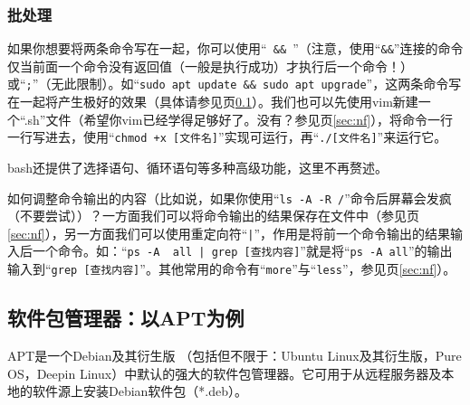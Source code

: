 \subsubsection{批处理}
\label{sec:bat}如果你想要将两条命令写在一起，你可以使用“\verb| && |”（注意，使用“\verb|&&|”连接的命令仅当前面一个命令没有返回值（一般是执行成功）才执行后一个命令！）或“\verb|;|”（无此限制）。如“\verb|sudo apt update && sudo apt upgrade|”，这两条命令写在一起将产生极好的效果（具体请参见\pageref{sec:apt}页\ref{sec:apt}）。我们也可以先使用vim新建一个“.sh”文件（希望你vim已经学得足够好了。没有？参见\pageref{sec:nf}页\ref{sec:nf}），将命令一行一行写进去，使用“\verb|chmod +x [文件名]|”实现可运行，再“\verb|./[文件名]|”来运行它。\par
bash还提供了选择语句、循环语句等多种高级功能，这里不再赘述。\par
如何调整命令输出的内容（比如说，如果你使用“\verb|ls -A -R /|”命令后屏幕会发疯（不要尝试））？一方面我们可以将命令输出的结果保存在文件中（参见\pageref{sec:nf}页\ref{sec:nf}），另一方面我们可以使用重定向符“\verb/|/”，作用是将前一个命令输出的结果输入后一个命令。如：“\verb/ps -A  all | grep [查找内容]/”就是将“\verb|ps -A all|”的输出输入到“\verb|grep [查找内容]|”。其他常用的命令有“\verb|more|”与“\verb|less|”，参见\pageref{sec:nf}页\ref{sec:nf}）。
\subsection{软件包管理器：以APT为例}
\label{sec:apt}APT是一个Debian及其衍生版 （包括但不限于：Ubuntu Linux及其衍生版，Pure OS，Deepin Linux）中默认的强大的软件包管理器。它可用于从远程服务器及本地的软件源上安装Debian软件包（*.deb）。
